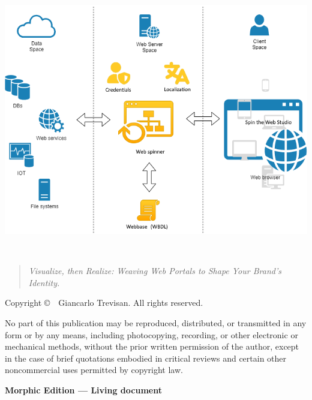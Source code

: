 \begin{titlepage}
\centering

\makeatletter
{\Huge\bfseries \@title\\[0.5cm]}

\ifx\@subtitle\@empty\else
{\Large \@subtitle\\[1.5cm]}
\fi

\vspace*{\fill}
\includegraphics[width=\textwidth]{figures/spin-the-web.png}
\vspace*{\fill}


{\large \organization\\[0.5cm]}

\begin{quote}
\centering
\textit{Visualize, then Realize: Weaving Web Portals to Shape Your Brand’s Identity.}
\end{quote}

\end{titlepage}

\thispagestyle{empty}
\null\vfill
\noindent
\thispagestyle{empty}
\vspace*{\fill}
\begin{center}
\small
Copyright \copyright\ \the\year\ Giancarlo Trevisan. All rights reserved.

\medskip

\noindent
No part of this publication may be reproduced, distributed, or transmitted in any form or by any means, including photocopying, recording, or other electronic or mechanical methods, without the prior written permission of the author, except in the case of brief quotations embodied in critical reviews and certain other noncommercial uses permitted by copyright law.

\medskip

\noindent
\textbf{Morphic Edition — Living document}

\end{center}

\clearpage
